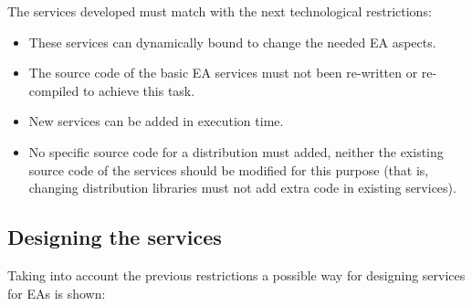 The services developed must match with the next technological restrictions:
\begin{itemize}
\item These services can dynamically bound to change the needed EA aspects. 
\item The source code of  the basic EA services must not been re-written or re-compiled to achieve this task. 
\item New services can be added in execution time. 
\item No specific source code for a distribution must added, neither the existing source code of the services should be modified for this purpose (that is, changing distribution libraries must not add extra code in existing services).
\end{itemize}

\subsection{Designing the services}

Taking into account the previous restrictions a possible way for designing services for EAs is shown: 


